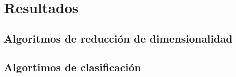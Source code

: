 \section{Resultados}

\subsection{Algoritmos de reducción de dimensionalidad}







\pagebreak
\subsection{Algortimos de clasificación}






